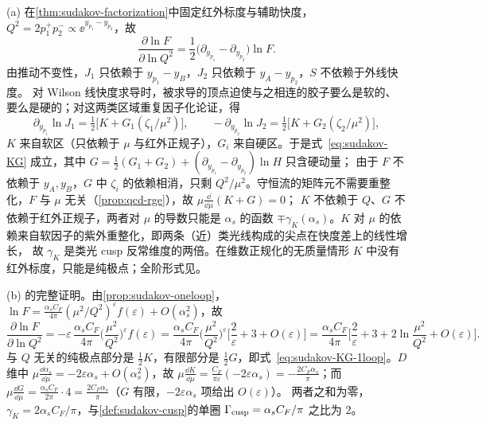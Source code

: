 \begin{proofsketch}
(a) 在\cref{thm:sudakov-factorization}中固定红外标度与辅助快度，$Q^2=2p_1^+p_2^-\propto\ee^{y_{p_1}-y_{p_2}}$，故
\[
\frac{\partial\ln F}{\partial\ln Q^2}=\frac12\big(\partial_{y_{p_1}}-\partial_{y_{p_2}}\big)\ln F .
\]
由推动不变性，$J_1$ 只依赖于 $y_{p_1}-y_B$，$J_2$ 只依赖于 $y_A-y_{p_2}$，$S$ 不依赖于外线快度。
对 Wilson 线快度求导时，被求导的顶点迫使与之相连的胶子要么是软的、要么是硬的；对这两类区域重复因子化论证，得
\[
\partial_{y_{p_1}}\ln J_1=\tfrac12\big[K+G_1(\zeta_1/\mu^2)\big],\qquad -\partial_{y_{p_2}}\ln J_2=\tfrac12\big[K+G_2(\zeta_2/\mu^2)\big],
\]
$K$ 来自软区（只依赖于 $\mu$ 与红外正规子），$G_i$ 来自硬区\cite[式~(10.112)--(10.117)]{Collins2011}。于是式~\eqref{eq:sudakov-KG} 成立，其中 $G=\frac12(G_1+G_2)+(\partial_{y_{p_1}}-\partial_{y_{p_2}})\ln H$ 只含硬动量；
由于 $F$ 不依赖于 $y_A,y_B$，$G$ 中 $\zeta_i$ 的依赖相消，只剩 $Q^2/\mu^2$。守恒流的矩阵元不需要重整化，$F$ 与 $\mu$ 无关（\cref{prop:qcd-rge}），故 $\mu\frac{\dd}{\dd\mu}(K+G)=0$；
$K$ 不依赖于 $Q$、$G$ 不依赖于红外正规子，两者对 $\mu$ 的导数只能是 $\alpha_s$ 的函数 $\mp\gamma_K(\alpha_s)$。$K$ 对 $\mu$ 的依赖来自软因子的紫外重整化，即两条（近）类光线构成的尖点在快度差上的线性增长，
故 $\gamma_K$ 是类光 cusp 反常维度的两倍\cite{Korchemsky1989,KorchemskyRadyushkin1987}。在维数正规化的无质量情形 $K$ 中没有红外标度，只能是纯极点；全阶形式见\cite{Collins:1980ih,Collins:1989bt,Magnea:1990zb}。

(b) 的完整证明。由\cref{prop:sudakov-oneloop}，$\ln F=\frac{\alpha_sC_F}{4\pi}(\mu^2/Q^2)^\varepsilon f(\varepsilon)+O(\alpha_s^2)$，故
\[
\frac{\partial\ln F}{\partial\ln Q^2}=-\varepsilon\,\frac{\alpha_sC_F}{4\pi}\Big(\frac{\mu^2}{Q^2}\Big)^{\varepsilon}f(\varepsilon)
=\frac{\alpha_sC_F}{4\pi}\Big(\frac{\mu^2}{Q^2}\Big)^{\varepsilon}\Big[\frac2\varepsilon+3+O(\varepsilon)\Big]
=\frac{\alpha_sC_F}{4\pi}\Big[\frac2\varepsilon+3+2\ln\frac{\mu^2}{Q^2}+O(\varepsilon)\Big].
\]
与 $Q$ 无关的纯极点部分是 $\frac12K$，有限部分是 $\frac12G$，即式~\eqref{eq:sudakov-KG-1loop}。$D$ 维中 $\mu\frac{\dd\alpha_s}{\dd\mu}=-2\varepsilon\alpha_s+O(\alpha_s^2)$，故
$\mu\frac{\dd K}{\dd\mu}=\frac{C_F}{\pi\varepsilon}(-2\varepsilon\alpha_s)=-\frac{2C_F\alpha_s}\pi$；而 $\mu\frac{\dd G}{\dd\mu}=\frac{\alpha_sC_F}{2\pi}\cdot4=\frac{2C_F\alpha_s}\pi$（$G$ 有限，$-2\varepsilon\alpha_s$ 项给出 $O(\varepsilon)$）。
两者之和为零，$\gamma_K=2\alpha_sC_F/\pi$，与\cref{def:sudakov-cusp}的单圈 $\Gamma_{\rm cusp}=\alpha_sC_F/\pi$ 之比为 $2$。
\end{proofsketch}

